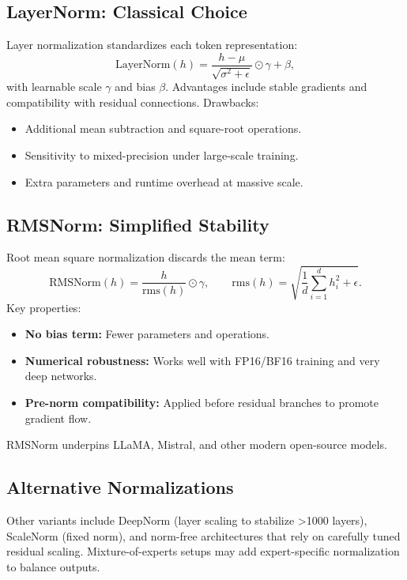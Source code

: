 \documentclass{article}
\begin{document}
\subsection{LayerNorm: Classical Choice}
Layer normalization standardizes each token representation:
\begin{equation}
  \mathrm{LayerNorm}(h) = \frac{h - \mu}{\sqrt{\sigma^2 + \epsilon}} \odot \gamma + \beta,
\end{equation}
with learnable scale $\gamma$ and bias $\beta$. Advantages include stable gradients and compatibility with residual connections. Drawbacks:
\begin{itemize}
  \item Additional mean subtraction and square-root operations.
  \item Sensitivity to mixed-precision under large-scale training.
  \item Extra parameters and runtime overhead at massive scale.
\end{itemize}

\subsection{RMSNorm: Simplified Stability}
Root mean square normalization discards the mean term:
\begin{equation}
  \mathrm{RMSNorm}(h) = \frac{h}{\mathrm{rms}(h)} \odot \gamma, \qquad \mathrm{rms}(h) = \sqrt{\frac{1}{d} \sum_{i=1}^{d} h_i^2 + \epsilon}.
\end{equation}
Key properties:
\begin{itemize}
  \item \textbf{No bias term:} Fewer parameters and operations.
  \item \textbf{Numerical robustness:} Works well with FP16/BF16 training and very deep networks.
  \item \textbf{Pre-norm compatibility:} Applied before residual branches to promote gradient flow.
\end{itemize}
RMSNorm underpins LLaMA, Mistral, and other modern open-source models.

\subsection{Alternative Normalizations}
Other variants include DeepNorm (layer scaling to stabilize >1000 layers), ScaleNorm (fixed norm), and norm-free architectures that rely on carefully tuned residual scaling. Mixture-of-experts setups may add expert-specific normalization to balance outputs.
\end{document}
